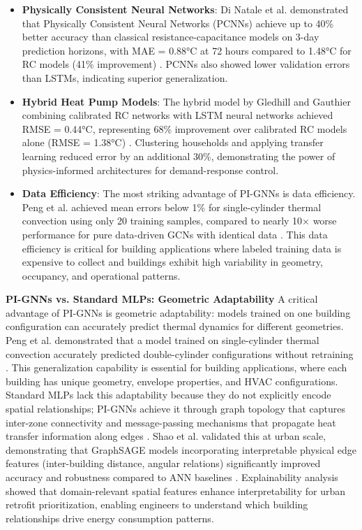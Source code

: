 \documentclass[12pt,a4paper]{article}
\begin{document}
\begin{itemize}
  \item \textbf{Physically Consistent Neural Networks}: Di Natale et al. demonstrated that Physically Consistent Neural Networks (PCNNs) achieve up to 40\% better accuracy than classical resistance-capacitance models on 3-day prediction horizons, with MAE = 0.88°C at 72 hours compared to 1.48°C for RC models (41\% improvement) \cite{ref6}. PCNNs also showed lower validation errors than LSTMs, indicating superior generalization.
\end{itemize}
\begin{itemize}
  \item \textbf{Hybrid Heat Pump Models}: The hybrid model by Gledhill and Gauthier combining calibrated RC networks with LSTM neural networks achieved RMSE = 0.44°C, representing 68\% improvement over calibrated RC models alone (RMSE = 1.38°C) \cite{ref55}. Clustering households and applying transfer learning reduced error by an additional 30\%, demonstrating the power of physics-informed architectures for demand-response control.
\end{itemize}
\begin{itemize}
  \item \textbf{Data Efficiency}: The most striking advantage of PI-GNNs is data efficiency. Peng et al. achieved mean errors below 1\% for single-cylinder thermal convection using only 20 training samples, compared to nearly 10× worse performance for pure data-driven GCNs with identical data \cite{ref162}. This data efficiency is critical for building applications where labeled training data is expensive to collect and buildings exhibit high variability in geometry, occupancy, and operational patterns.
\end{itemize}
\textbf{PI-GNNs vs. Standard MLPs: Geometric Adaptability}
A critical advantage of PI-GNNs is geometric adaptability: models trained on one building configuration can accurately predict thermal dynamics for different geometries. Peng et al. demonstrated that a model trained on single-cylinder thermal convection accurately predicted double-cylinder configurations without retraining \cite{ref162}. This generalization capability is essential for building applications, where each building has unique geometry, envelope properties, and HVAC configurations. Standard MLPs lack this adaptability because they do not explicitly encode spatial relationships; PI-GNNs achieve it through graph topology that captures inter-zone connectivity and message-passing mechanisms that propagate heat transfer information along edges \cite{ref30}.
Shao et al. validated this at urban scale, demonstrating that GraphSAGE models incorporating interpretable physical edge features (inter-building distance, angular relations) significantly improved accuracy and robustness compared to ANN baselines \cite{ref51}. Explainability analysis showed that domain-relevant spatial features enhance interpretability for urban retrofit prioritization, enabling engineers to understand which building relationships drive energy consumption patterns.
\end{document}
